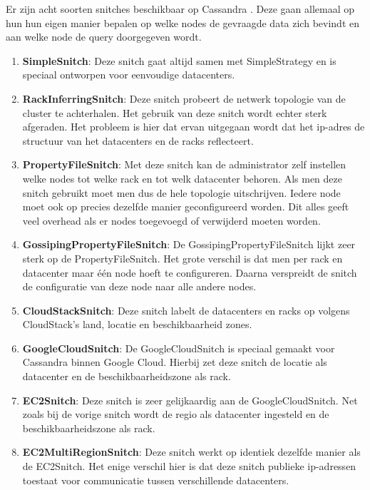 Er zijn acht soorten snitches beschikbaar op Cassandra \citep{strickland2014availability}.
Deze gaan allemaal op hun hun eigen manier bepalen op welke nodes de gevraagde data zich bevindt en aan welke node de query doorgegeven wordt.

\begin{enumerate}
	\item \textbf{SimpleSnitch}:
	Deze snitch gaat altijd samen met SimpleStrategy en is speciaal ontworpen voor eenvoudige datacenters.
	
	\item \textbf{RackInferringSnitch}:
	Deze snitch probeert de netwerk topologie van de cluster te achterhalen.
	Het gebruik van deze snitch wordt echter sterk afgeraden.
	Het probleem is hier dat ervan uitgegaan wordt dat het ip-adres de structuur van het datacenters en de racks reflecteert.
	
	\item \textbf{PropertyFileSnitch}:
	Met deze snitch kan de administrator zelf instellen welke nodes tot welke rack en tot welk datacenter behoren.
	Als men deze snitch gebruikt moet men dus de hele topologie uitschrijven. 
	Iedere node moet ook op precies dezelfde manier geconfigureerd worden.
	Dit alles geeft veel overhead als er nodes toegevoegd of verwijderd moeten worden.
	
	\item \textbf{GossipingPropertyFileSnitch}:
	De GossipingPropertyFileSnitch lijkt zeer sterk op de PropertyFileSnitch.
	Het grote verschil is dat men per rack en datacenter maar één node hoeft te configureren.
	Daarna verspreidt de snitch de configuratie van deze node naar alle andere nodes.
	
	\item \textbf{CloudStackSnitch}:
	Deze snitch labelt de datacenters en racks op volgens CloudStack's land, locatie en beschikbaarheid zones.
	
	\item \textbf{GoogleCloudSnitch}:
	De GoogleCloudSnitch is speciaal gemaakt voor Cassandra binnen Google Cloud.
	Hierbij zet deze snitch de locatie als datacenter en de beschikbaarheidszone als rack.
	
	\item \textbf{EC2Snitch}:
	Deze snitch is zeer gelijkaardig aan de GoogleCloudSnitch.
	Net zoals bij de vorige snitch wordt de regio als datacenter ingesteld en de beschikbaarheidszone als rack.
	
	\item \textbf{EC2MultiRegionSnitch}:
	Deze snitch werkt op identiek dezelfde manier als de EC2Snitch.
	Het enige verschil hier is dat deze snitch publieke ip-adressen toestaat voor communicatie tussen verschillende datacenters.
	
\end{enumerate}

